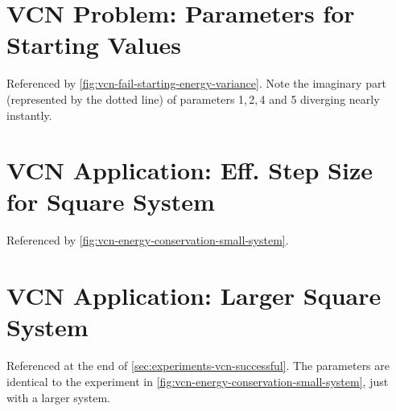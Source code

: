 \newpage
{}
\newpage
\begin{minipage}{\textwidth}
    \section{VCN Problem: Parameters for Starting Values} %
        \label{appendix:vcn-fail-starting-parameters}
        Referenced by \autoref{fig:vcn-fail-starting-energy-variance}. Note the imaginary part (represented by the dotted line) of parameters 1,\,2,\,4 and 5 diverging nearly instantly.\\
        \vbox{
        }
\end{minipage}

\newpage
{}
\newpage
\begin{minipage}{\textwidth}
    \section{VCN Application: Eff. Step Size for Square System} %
        \label{appendix:vcn-success-small}
        Referenced by \autoref{fig:vcn-energy-conservation-small-system}.\\
        \vbox{
        }
\end{minipage}

\newpage
{}
\newpage
\begin{minipage}{\textwidth}
    \section{VCN Application: Larger Square System} %
        \label{appendix:vcn-success-big}
        Referenced at the end of \autoref{sec:experiments-vcn-successful}. The parameters are identical to the experiment in \autoref{fig:vcn-energy-conservation-small-system}, just with a larger system.\\
        \vbox{
        }
\end{minipage}
\newpage
\begin{minipage}{\textwidth}
    \vbox{
    }
\end{minipage}

